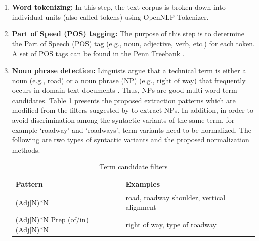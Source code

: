 \documentclass[Journal, BackFigs, DoubleSpace]{ascelike} %
\begin{document}
\begin{enumerate} [label=\roman*]
	\item \textbf{Word tokenizing:} In this step, the text corpus is broken down into individual units (also called tokens) using OpenNLP Tokenizer.
	\item \textbf{Part of Speed (POS) tagging:} The purpose of this step is to determine the Part of Speech (POS) tag (e.g., noun, adjective, verb, etc.) for each token. A set of POS tags can be found in the Penn Treebank \cite{marcus93}.
	\item \textbf{Noun phrase detection:} Linguists argue that a technical term is either a noun (e.g., road) or a noun phrase (NP) (e.g., right of way) that frequently occurs in domain text documents \cite{justeson95}. Thus, NPs are good multi-word term candidates. Table \ref{table:term_filter} presents the proposed extraction patterns which are modified from the filters suggested by  to extract NPs. %
	In addition, in order to avoid discrimination among the syntactic variants of the same term, for example `roadway' and `roadways', term variants need to be normalized. The following are two types of syntactic variants and the proposed normalization methods.
	\begin{table} [t]
		\caption{Term candidate filters}
		\label{table:term_filter}
		\centering
		\small
		\renewcommand{\arraystretch}{1.25}
		\begin{tabular}{l l}
			\hline
			\textbf{Pattern} & \textbf{Examples}\\
			\hline
			(Adj|N)*N		& road, roadway shoulder, vertical alignment\\
			(Adj|N)*N Prep (of/in) (Adj|N)*N	&	right of way, type of roadway\\

\end{tabular}
\end{table}
\end{enumerate}
\end{document}
